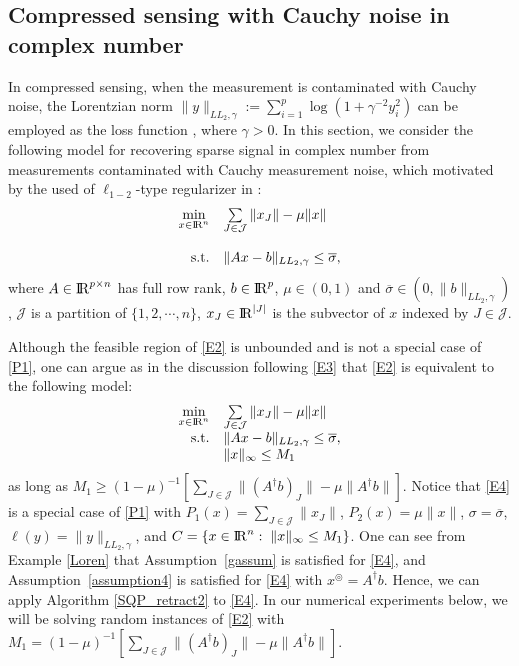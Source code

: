 \documentclass[10pt]{article}
\numberwithin{equation}{section}
\def\R{{\rm I\!R}}
\def\hx{{\widehat x}}
\def\xfeasss{x^\circledcirc}
\begin{document}
\subsection{Compressed sensing with Cauchy noise in complex number}\label{sec6.2}
{\color{blue} In compressed sensing, when the measurement is contaminated with Cauchy noise, the Lorentzian norm $\|y\|_{LL_2,\gamma}:= \sum\limits_{i=1}^p\log(1 + \gamma^{-2}y_i^2)$ can be employed as the loss function \cite{CaBA10,CaRA16}, where $\gamma > 0$. In this section, we consider the following model for recovering sparse signal in complex number from measurements contaminated with Cauchy measurement noise, which motivated by the used of $\ell_{1-2}$-type regularizer in \cite{YiLH15}:
\begin{equation}\label{E2}
  \begin{array}{rl}
\min\limits_{x\in\R^n} & \sum\limits_{J\in\mathcal{J}}\|x_J\| - \mu\|x\| \\\\
{\rm s.t.} & \|Ax - b\|_{LL_2,\gamma}\leq \overline{\sigma},
  \end{array}
\end{equation}
where $A\in\R^{p\times n}$ has full row rank, $b\in\R^p$, $\mu \in (0,1)$ and $\overline{\sigma} \in (0,\|b\|_{LL_2,\gamma})$, $\mathcal{J}$ is a partition of $\{1,2,\cdots, n\}$, $x_J\in\R^{|J|}$ is the subvector of $x$ indexed by $J\in\mathcal{J}$.%

Although the feasible region of \eqref{E2} is unbounded and is not a special case of \eqref{P1}, one can argue as in the discussion following \eqref{E3} that \eqref{E2} is equivalent to the following model:
\begin{equation}\label{E4}
  \begin{array}{rl}
\min\limits_{x\in\R^n} & \sum\limits_{J\in\mathcal{J}}\|x_J\| - \mu\|x\| \\
{\rm s.t.} & \|Ax - b\|_{LL_2,\gamma}\leq \overline{\sigma},\\
           & \|x\|_{\infty} \leq M_1
  \end{array}
\end{equation}
as long as $M_1 \ge (1 - \mu)^{-1}[\sum\limits_{J\in\mathcal{J}}\|(A^\dagger b)_J\| - \mu\|A^\dagger b\|]$.
Notice that \eqref{E4} is a special case of \eqref{P1} with $P_1(x) = \sum\limits_{J\in\mathcal{J}}\|x_J\|$, $P_2(x) = \mu\|x\|$,  $\sigma=\overline{\sigma}$, $\ell(y) = \|y\|_{LL_2,\gamma}$, and $C = \{x\in\R^n:\; \|x\|_{\infty} \leq M_1\}$. One can see  from Example \ref{Loren} that Assumption~\ref{gassum} is satisfied for \eqref{E4}, and Assumption~\ref{assumption4} is satisfied for \eqref{E4} with $\xfeasss = A^\dagger b$. Hence, we can apply Algorithm \ref{SQP_retract2} to \eqref{E4}. In our numerical experiments below, we will be solving random instances of \eqref{E2} with $M_1 = (1 - \mu)^{-1}[\sum\limits_{J\in\mathcal{J}}\|(A^\dagger b)_J\| - \mu\|A^\dagger b\|]$. }
\end{document}
